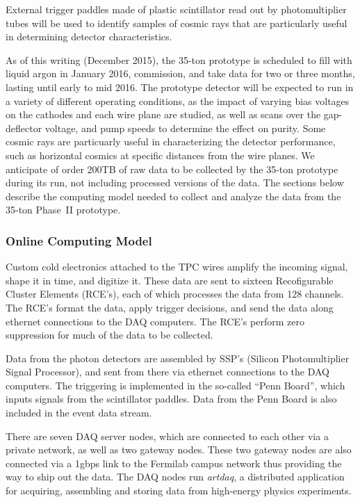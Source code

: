 External trigger paddles made of plastic scintillator read out by photomultiplier tubes
will be used to identify samples of cosmic rays that are particularly useful in determining
detector characteristics.

As of this writing (December 2015), the 35-ton prototype is scheduled to fill with liquid argon
in January 2016, commission, and take data for two or three months, lasting until early to mid 2016.
The prototype detector will be expected to run in a variety of different operating conditions, as
the impact of varying bias voltages on the cathodes and each wire plane are studied, as well as
scans over the gap-deflector voltage, and pump speeds to determine the effect on purity.  Some cosmic
rays are particuarly useful in characterizing the detector performance, such as horizontal cosmics
at specific distances from the wire planes.  We anticipate of order 200TB of raw data to be collected
by the 35-ton prototype during its run, not including processed versions of the data.
The sections below describe the computing model needed
to collect and analyze the data from the 35-ton Phase~II prototype.

\subsubsection{Online Computing Model}

Custom cold electronics attached to the TPC wires amplify the incoming signal, shape it in time,
and digitize it.  These data are sent to sixteen Recofigurable Cluster Elements (RCE's), each of which
processes the data from 128 channels.  The RCE's format the data, apply trigger decisions, and send the
data along ethernet connections to the DAQ computers.  The RCE's perform zero suppression for
much of the data to be collected.


Data from the photon detectors are assembled
by SSP's (Silicon Photomultiplier Signal Processor), and sent from there via ethernet connections to the DAQ computers.  The
triggering is implemented in the so-called ``Penn Board'', which inputs signals from the scintillator paddles.  Data
from the Penn Board is also included in the event data stream.

There are seven DAQ server nodes, which are connected to each other via a private network, as well as two gateway nodes. 
These two gateway nodes are also connected via a 1gbps link to the Fermilab campus network thus providing the way
to ship out the data. The DAQ nodes run {\it artdaq}, a distributed application for acquiring, assembling and storing data from high-energy
physics experiments. 


